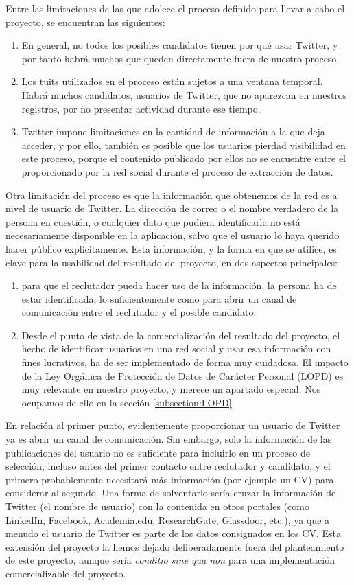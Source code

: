 Entre las limitaciones de las que adolece el proceso definido para llevar a cabo el proyecto, se encuentran las 
siguientes:
\begin{enumerate}
\item En general, no todos los posibles candidatos tienen por qué usar Twitter, y por tanto habrá muchos que 
queden directamente fuera de nuestro proceso.
\item Los tuits utilizados en el proceso están sujetos a una ventana temporal. Habrá muchos candidatos,
usuarios de Twitter, que no aparezcan en nuestros registros, por no presentar actividad durante ese tiempo.
\item Twitter impone limitaciones en la cantidad de información a la que deja acceder, y por ello, también es
posible que los usuarios pierdad visibilidad en este proceso, 
porque el contenido publicado por ellos no se encuentre entre el proporcionado por la red social durante el proceso
de extracción de datos.
\end{enumerate}


Otra limitación del proceso es que la información que obtenemos de la red es a nivel de usuario de Twitter. 
La dirección de correo o el nombre verdadero de la persona en cuestión, o cualquier dato que pudiera identificarla
no está necesariamente disponible en la aplicación, salvo que el usuario lo haya querido hacer público explícitamente. 
Esta información, y la forma en que se utilice, es clave para la usabilidad del resultado del proyecto, en dos aspectos principales:
\begin{enumerate}
\item para que el reclutador pueda hacer uso de la información, la persona ha de estar identificada, lo suficientemente
como para abrir un canal de comunicación entre el reclutador y el posible candidato.
\item Desde el punto de vista de la comercialización del resultado del proyecto, el hecho de identificar usuarios en una red
social y usar esa información con fines lucrativos, ha de ser implementado de forma muy cuidadosa. El impacto de la Ley 
Orgánica de Protección de Datos de Carácter Personal (LOPD) es muy relevante en nuestro proyecto, y merece un apartado especial.
Nos ocupamos de ello en la sección \ref{subsection:LOPD}.
\end{enumerate}
En relación al primer punto, evidentemente proporcionar un usuario de Twitter ya es abrir un canal de
comunicación. Sin embargo, solo la información de las publicaciones del usuario no es suficiente para 
incluirlo en un proceso de selección, incluso antes del primer contacto entre reclutador y candidato,
y el primero probablemente  necesitará más información (por ejemplo un CV) para considerar al segundo. 
Una forma de solventarlo sería cruzar la información de Twitter (el nombre de usuario)
con la contenida en otros portales (como LinkedIn,  Facebook, Academia.edu, ResearchGate, Glassdoor, etc.),
ya que a menudo el usuario de Twitter es parte de los datos consignados en los CV. Esta extensión
del proyecto la hemos dejado deliberadamente fuera del planteamiento de este proyecto, aunque sería 
{\em conditio sine qua non} para una implementación comercializable del proyecto.




